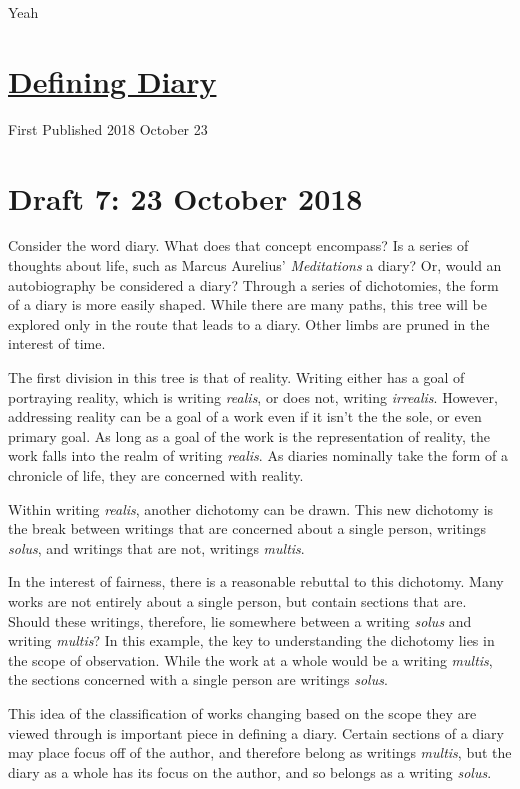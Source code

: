 Yeah \documentclass[12pt]{article}[titlepage]
\newcommand{\1}{\={a}}
\newcommand{\2}{\={e}}
\newcommand{\3}{\={\i}}
\newcommand{\4}{\=o}
\newcommand{\5}{\=u}
\newcommand{\6}{\={A}}
\renewcommand{\,}{\textsuperscript{,}}
\begin{document}
\doublespacing
\section{\href{defining-diary.html}{Defining Diary}}
First Published 2018 October 23
\section{Draft 7: 23 October 2018}
Consider the word diary.
What does that concept encompass?
Is a series of thoughts about life, such as Marcus Aurelius' \textit{Meditations} a diary?
Or, would an autobiography be considered a diary?
Through a series of dichotomies, the form of a diary is more easily shaped. 
While there are many paths, this tree will be explored only in the route that leads to a diary.
Other limbs are pruned in the interest of time.

The first division in this tree is that of reality.
Writing either has a goal of portraying reality, which is writing \textit{realis}, or does not, writing \textit{irrealis}.
However, addressing reality can be a goal of a work even if it isn't the the sole, or even primary goal.
As long as a goal of the work is the representation of reality, the work falls into the realm of writing \textit{realis}.
As diaries nominally take the form of a chronicle of life, they are concerned with reality.

Within writing \textit{realis}, another dichotomy can be drawn.
This new dichotomy is the break between writings that are concerned about a single person, writings \textit{solus}, and writings that are not, writings \textit{multis}.

In the interest of fairness, there is a reasonable rebuttal to this dichotomy.
Many works are not entirely about a single person, but contain sections that are.
Should these writings, therefore, lie somewhere between a writing \textit{solus} and writing \textit{multis}?
In this example, the key to understanding the dichotomy lies in the scope of observation.
While the work at a whole would be a writing \textit{multis}, the sections concerned with a single person are writings \textit{solus}.

This idea of the classification of works changing based on the scope they are viewed through is important piece in defining a diary.
Certain sections of a diary may place focus off of the author, and therefore belong as writings \textit{multis}, but the diary as a whole has its focus on the author, and so belongs as a writing \textit{solus}.
\end{document}
